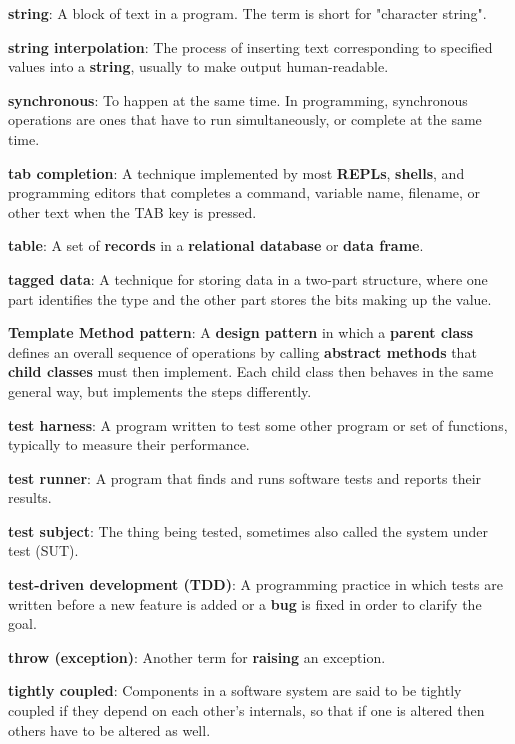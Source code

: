 \documentclass[krantzl]{krantz}
\newcommand{\glosskey}[1]{\textbf{#1}}
\begin{document}
\noindent \textbf{\glosskey{string}}: 
A block of text in a program. The term is short for "character string".


\noindent \textbf{\glosskey{string interpolation}}: 
The process of inserting text corresponding to specified values into a \glosskey{string}, usually to make output human-readable.


\noindent \textbf{\glosskey{synchronous}}: 
To happen at the same time. In programming, synchronous operations are ones that have to run simultaneously, or complete at the same time.


\noindent \textbf{\glosskey{tab completion}}: 
A technique implemented by most \glosskey{REPLs}, \glosskey{shells}, and programming editors that completes a command, variable name, filename, or other text when the TAB key is pressed.


\noindent \textbf{\glosskey{table}}: 
A set of \glosskey{records} in a \glosskey{relational database} or \glosskey{data frame}.


\noindent \textbf{\glosskey{tagged data}}: 
A technique for storing data in a two-part structure, where one part identifies the type and the other part stores the bits making up the value.


\noindent \textbf{\glosskey{Template Method pattern}}: 
A \glosskey{design pattern} in which a \glosskey{parent class} defines an overall sequence of operations by calling \glosskey{abstract methods} that \glosskey{child classes} must then implement. Each child class then behaves in the same general way, but implements the steps differently.


\noindent \textbf{\glosskey{test harness}}: 
A program written to test some other program or set of functions, typically to measure their performance.


\noindent \textbf{\glosskey{test runner}}: 
A program that finds and runs software tests and reports their results.


\noindent \textbf{\glosskey{test subject}}: 
The thing being tested, sometimes also called the system under test (SUT).


\noindent \textbf{\glosskey{test-driven development} (TDD)}: 
A programming practice in which tests are written before a new feature is added or a \glosskey{bug} is fixed in order to clarify the goal.


\noindent \textbf{\glosskey{throw (exception)}}: 
Another term for \glosskey{raising} an exception.


\noindent \textbf{\glosskey{tightly coupled}}: 
Components in a software system are said to be tightly coupled if they depend on each other's internals, so that if one is altered then others have to be altered as well.
\end{document}
